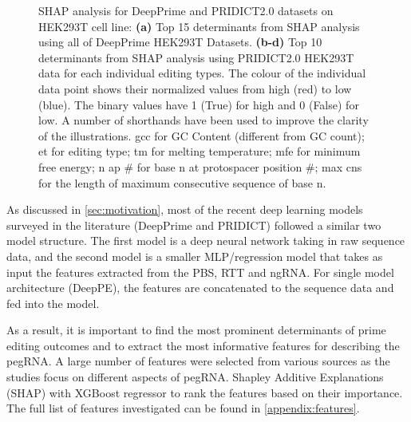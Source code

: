 \begin{figure}
    \caption[SHAP analysis for DeepPrime and PRIDICT2.0 datasets]{SHAP analysis for DeepPrime and PRIDICT2.0 datasets on HEK293T cell line: \textbf{(a)} Top 15 determinants from SHAP analysis using all of DeepPrime HEK293T Datasets. \textbf{(b-d)} Top 10 determinants from SHAP analysis using PRIDICT2.0 HEK293T data for each individual editing types. The colour of the individual data point shows their normalized values from high (red) to low (blue). The binary values have 1 (True) for high and 0 (False) for low. A number of shorthands have been used to improve the clarity of the illustrations. gcc for GC Content (different from GC count); et for editing type; tm for melting temperature; mfe for minimum free energy; n ap \# for base n at protospacer position \#; max cns for the length of maximum consecutive sequence of base n.} 
    \label{fig:shap}
\end{figure}

As discussed in \autoref{sec:motivation}, most of the recent deep learning models surveyed in the literature (DeepPrime\cite{yuPredictionEfficienciesDiverse2023} and PRIDICT\cite{mathisPredictingPrimeEditing2023,mathisMachineLearningPrediction2024}) followed a similar two model structure. The first model is a deep neural network taking in raw sequence data, and the second model is a smaller MLP/regression model that takes as input the features extracted from the PBS, RTT and ngRNA. For single model architecture (DeepPE\cite{kimPredictingEfficiencyPrime2021}), the features are concatenated to the sequence data and fed into the model.

As a result, it is important to find the most prominent determinants of prime editing outcomes and to extract the most informative features for describing the pegRNA. A large number of features were selected from various sources as the studies focus on different aspects of pegRNA. Shapley Additive Explanations (SHAP) with XGBoost regressor to rank the features based on their importance. The full list of features investigated can be found in \autoref{appendix:features}. 

